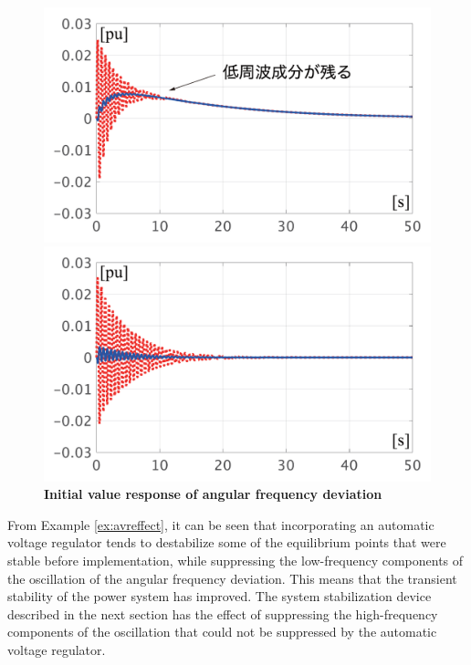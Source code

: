 \documentclass[graybox, envcountchap]{svmult}
\begin{document}
\begin{figure}[t]
  \centering
  {
  \begin{minipage}{0.49\linewidth}
    \centering
    \includegraphics[width = 1.0\linewidth]{figs/woAVRlarge}
  \end{minipage}
  \begin{minipage}{0.49\linewidth}
    \centering
    \includegraphics[width = 1.0\linewidth]{figs/wAVRlarge}
  \end{minipage}
  \medskip
  \caption{\textbf{Initial value response of angular frequency deviation}
  \\  
}
  \label{fig:avrlarged}
  }
\medskip
\end{figure}

From Example \ref{ex:avreffect}, it can be seen that incorporating an automatic
voltage regulator tends to destabilize some of the equilibrium points that were
stable before implementation, while suppressing the low-frequency components of
the oscillation of the angular frequency deviation. This means that the
transient stability of the power system has improved. The system stabilization
device described in the next section has the effect of suppressing the
high-frequency components of the oscillation that could not be suppressed by the
automatic voltage regulator.
\end{document}
